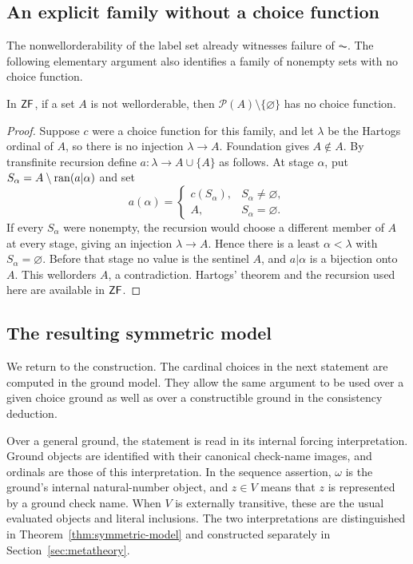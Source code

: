 \subsection{An explicit family without a choice function}

The nonwellorderability of the label set already witnesses failure of
$\AC$.  The following elementary argument also identifies a family of
nonempty sets with no choice function.

\begin{lemma}\label{lemma:explicit-choice-failure}
In $\mathsf{ZF}$, if a set $A$ is not wellorderable, then
$\mathcal P(A)\setminus\{\varnothing\}$ has no choice function.
\end{lemma}

\begin{proof}
Suppose $c$ were a choice function for this family, and let $\lambda$
be the Hartogs ordinal of $A$, so there is no injection
$\lambda\longrightarrow A$.  Foundation gives $A\notin A$.
By transfinite recursion define $a:\lambda\longrightarrow A\cup\{A\}$
as follows.  At stage $\alpha$, put
$S_\alpha=A\setminus\operatorname{ran}(a|\alpha)$ and set
\[
 a(\alpha)=
 \begin{cases}
 c(S_\alpha),&S_\alpha\ne\varnothing,\\
 A,&S_\alpha=\varnothing.
 \end{cases}
\]
If every $S_\alpha$ were nonempty, the recursion would choose a
different member of $A$ at every stage, giving an injection
$\lambda\longrightarrow A$.  Hence there is a least $\alpha<\lambda$
with $S_\alpha=\varnothing$.  Before that stage no value is the
sentinel $A$, and $a|\alpha$ is a bijection onto $A$.  This
wellorders $A$, a contradiction.  Hartogs' theorem and the recursion
used here are available in $\mathsf{ZF}$.
\end{proof}

\subsection{The resulting symmetric model}

We return to the construction.  The cardinal choices in the next
statement are computed in the ground model.  They allow the same
argument to be used over a given choice ground as well as over a
constructible ground in the consistency deduction.

Over a general ground, the statement is read in its internal forcing
interpretation. Ground objects are identified with their canonical
check-name images, and ordinals are those of this interpretation.
In the sequence assertion, $\omega$ is the ground's internal
natural-number object, and $z\in V$ means that $z$ is represented
by a ground check name. When $V$ is externally transitive, these
are the usual evaluated objects and literal inclusions. The two
interpretations are distinguished in Theorem~\ref{thm:symmetric-model}
and constructed separately in Section~\ref{sec:metatheory}.

